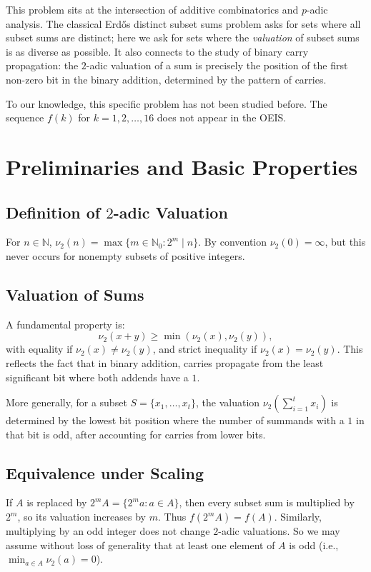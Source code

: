 \documentclass[11pt]{article}
\newcommand{\vtwo}{\nu_2}
\newcommand{\NN}{\mathbb{N}}
\begin{document}
This problem sits at the intersection of additive combinatorics and $p$-adic analysis. 
The classical Erdős distinct subset sums problem asks for sets where all subset sums are distinct; here we ask for sets where the \emph{valuation} of subset sums is as diverse as possible.
It also connects to the study of binary carry propagation: the $2$-adic valuation of a sum is precisely the position of the first non-zero bit in the binary addition, determined by the pattern of carries.

To our knowledge, this specific problem has not been studied before. 
The sequence $f(k)$ for $k=1,2,\dots,16$ does not appear in the OEIS.

\section{Preliminaries and Basic Properties}

\subsection{Definition of $2$-adic Valuation}
For $n \in \NN$, $\vtwo(n) = \max\{m \in \NN_0 : 2^m \mid n\}$. By convention $\vtwo(0) = \infty$, but this never occurs for nonempty subsets of positive integers.

\subsection{Valuation of Sums}
A fundamental property is:
\[
\vtwo(x + y) \ge \min(\vtwo(x), \vtwo(y)),
\]
with equality if $\vtwo(x) \neq \vtwo(y)$, and strict inequality if $\vtwo(x) = \vtwo(y)$.
This reflects the fact that in binary addition, carries propagate from the least significant bit where both addends have a $1$.

More generally, for a subset $S = \{x_1, \dots, x_t\}$, the valuation $\vtwo(\sum_{i=1}^t x_i)$ is determined by the lowest bit position where the number of summands with a $1$ in that bit is odd, after accounting for carries from lower bits.

\subsection{Equivalence under Scaling}
If $A$ is replaced by $2^m A = \{2^m a : a \in A\}$, then every subset sum is multiplied by $2^m$, so its valuation increases by $m$. Thus $f(2^m A) = f(A)$. Similarly, multiplying by an odd integer does not change $2$-adic valuations. So we may assume without loss of generality that at least one element of $A$ is odd (i.e., $\min_{a \in A} \vtwo(a) = 0$).
\end{document}
